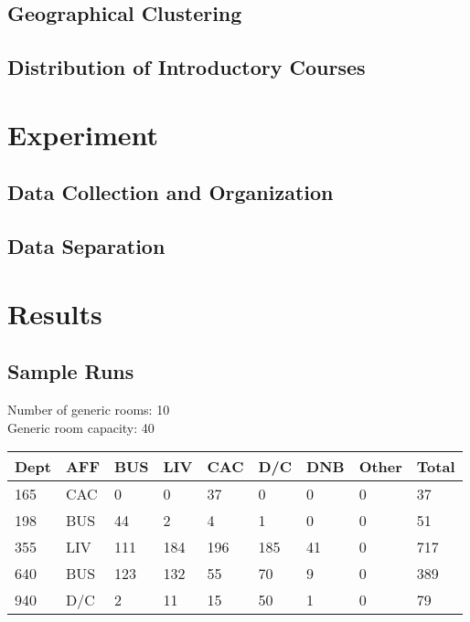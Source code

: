 \documentclass[12pt]{article}
\begin{document}
	\subsection{Geographical Clustering}

	\subsection{Distribution of Introductory Courses}

\section{Experiment}

	\subsection{Data Collection and Organization}

	\subsection{Data Separation}

\section{Results}

	\subsection{Sample Runs}
		Number of generic rooms: 10 \\
		Generic room capacity: 40
		\begin{center}
			 \label{tab:title} 
			\begin{tabular} { | l | l | l | l | l | l | l | l | l | }
				\hline
				Dept & AFF & BUS & LIV & CAC & D/C & DNB & Other & Total \\ \hline
				165 & CAC & 0 & 0 & 37 & 0 & 0 & 0 & 37 \\ \hline
				198 & BUS & 44 & 2 & 4 & 1 & 0 & 0 & 51 \\ \hline
				355 & LIV & 111 & 184 & 196 & 185 & 41 & 0 & 717 \\ \hline
				640 & BUS & 123 & 132 & 55 & 70 & 9 & 0 & 389 \\ \hline
				940 & D/C & 2 & 11 & 15 & 50 & 1 & 0 & 79 \\ \hline
			\end{tabular}
		\end{center}
\end{document}
